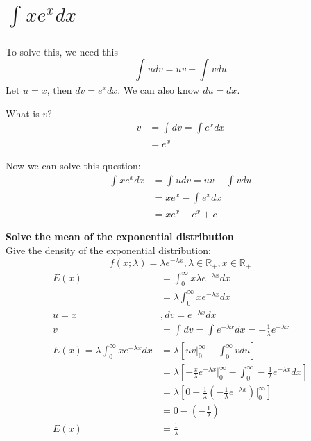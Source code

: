 \documentclass[12pt]{article}
\title{}
\author{}
\date{}
\begin{document}
\maketitle


\section{$ \int_{}^{} xe^{x}dx $}


To solve this, we need this
\begin{equation*}
\int_{}^{} udv = uv - \int_{}^{} v du
\end{equation*}
Let $ u = x $, then $ dv = e^{x}dx $. We can also know $ du = dx $.

What is $ v $?
\begin{align*}
v &= \int_{}^{} dv = \int_{}^{} e^{x}dx\\
&= e^{x}
\end{align*}

Now we can solve this question:
\begin{align*}
\int_{}^{} xe^{x}dx &= \int_{}^{} u dv = uv - \int_{}^{} vdu\\
&= xe^{x} - \int_{}^{} e^{x}dx\\
&= xe^{x} - e^{x} + c
\end{align*}




{\textbf {Solve the mean of the exponential distribution}}\\
Give the density of the exponential distribution:
\begin{equation*}
f(x;\lambda) = \lambda e^{ - \lambda x}, \lambda \in \mathbb{R}_{+}, x \in \mathbb{R}
_{+}
\end{equation*}
\begin{align*}
E(x)&= \int_{0}^{\infty } x \lambda e^{ - \lambda x}dx\\
&= \lambda \int_{0}^{\infty } x e^{ - \lambda x}dx\\
u = x &, dv =  e^{ - \lambda x}dx\\
v&= \int_{}^{} dv = \int_{}^{}  e^{ - \lambda x}dx =  - \frac{1}{\lambda}e^{ - \lambda
x}\\
E(x) = \lambda \int_{0}^{\infty } xe^{ - \lambda x}dx
&= \lambda \left[ uv \Bigg|^{\infty }_{0} - \int_{0}^{\infty }vdu  \right] \\
&= \lambda \left[  - \frac{x}{\lambda}e^{ - \lambda x} \Bigg|^{\infty }_{0}
 - \int_{0}^{\infty } - \frac{1}{\lambda}e^{ - \lambda x} dx \right] \\
&= \lambda \left[ 0 + \frac{1}{\lambda} 
\left(  - \frac{1}{\lambda} e^{ - \lambda x} \right) \Bigg|^{\infty }_{0} \right] \\
&= 0 - ( - \frac{1}{\lambda})\\
E(x)&= \frac{1}{\lambda}
\end{align*}
\end{document}
